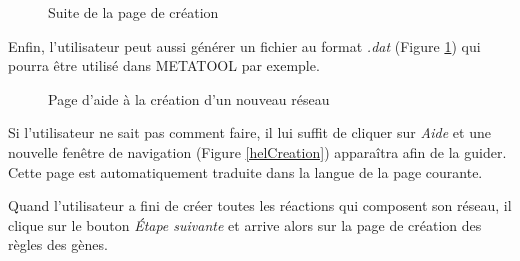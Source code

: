 \begin{figure}[!ht]
	\begin{center}
		\caption{Suite de la page de création}
  		\label{creation2}
  	\end{center}	
\end{figure}

Enfin, l'utilisateur peut aussi générer un fichier au format \emph{.dat} (Figure \ref{creation2}) qui pourra être utilisé dans METATOOL par exemple.\\

\begin{figure}[!ht]
	\begin{center}
		\caption{Page d'aide à la création d'un nouveau réseau}
  		\label{helpCreation}
  	\end{center}	
\end{figure}

Si l'utilisateur ne sait pas comment faire, il lui suffit de cliquer sur \textit{Aide} et une nouvelle fen\^etre de navigation (Figure \ref{helCreation}) appara\^itra afin de la guider. Cette page est automatiquement traduite dans la langue de la page courante. 

Quand l'utilisateur a fini de créer toutes les réactions qui composent son réseau, il clique sur le bouton \emph{\'Etape suivante} et arrive alors sur la page de création des règles des gènes.

